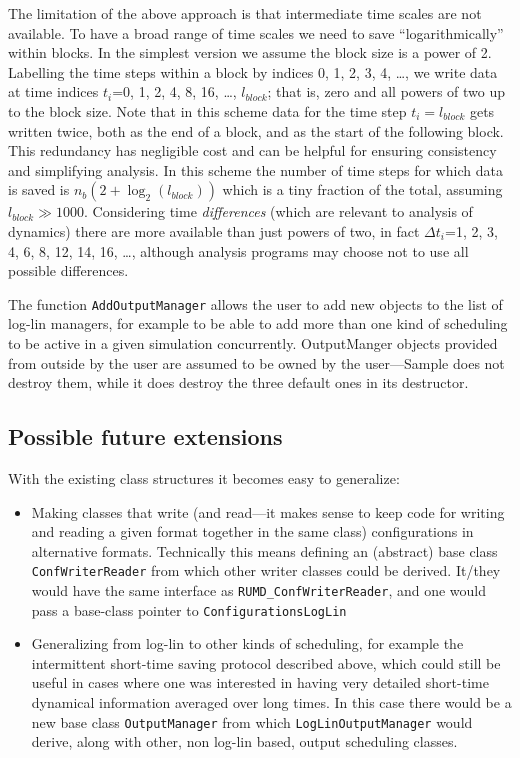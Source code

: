 \documentclass[a4paper]{article}
\begin{document}
The limitation of the above approach is that intermediate time scales are
not available. To have a broad range of time scales we need to save 
``logarithmically'' within blocks. In the simplest version we assume the block 
size is a power of 2. Labelling the time steps within a block by indices 
0, 1, 2, 3, 4, \ldots,  we write data at time indices $t_i$=0, 1, 2, 4, 8, 16,
\ldots, $l_{block}$; that is, zero and all powers of two up to the block size. 
Note that in this scheme data for the time step $t_i=l_{block}$ gets written
twice, both as the end of a block, and as the start of the following block.
This redundancy has negligible cost and can be helpful for ensuring consistency
and simplifying analysis. In this scheme the number of time steps for which 
data is saved is $n_b (2+\log_2(l_{block}))$ which is a tiny fraction of the 
total, assuming $l_{block} \gg 1000$.
Considering time {\em differences} (which are relevant to analysis of dynamics)
there are more available than just powers of two,  in fact 
$\Delta t_i$=1, 2, 3, 4, 6, 8, 12, 14, 16, \ldots, although analysis programs
may choose not to use all possible differences. 


The function \verb|AddOutputManager| allows the user to add new objects
to the list of log-lin managers, for example to be able to add more than one 
kind of scheduling to
be active in a given simulation concurrently. OutputManger objects provided
from outside by the user are assumed to be owned by the user---Sample does not
destroy them, while it does destroy the three default ones in its destructor.


\subsection{Possible future extensions}

With the existing class structures it becomes easy to generalize:

\begin{itemize} 
\item Making classes that write (and read---it makes sense to keep code for
writing and reading a given format together in the same class) configurations 
in alternative formats. Technically this means defining an (abstract) base class
\verb|ConfWriterReader| from which other writer classes could be derived. 
It/they would have the same interface as \verb|RUMD_ConfWriterReader|, and
one would pass a base-class pointer to \verb|ConfigurationsLogLin|
\item Generalizing from
log-lin to other kinds of scheduling, for example
the intermittent short-time saving protocol described above, 
which could still be useful in cases where one was interested in 
having very detailed short-time dynamical information averaged over long
times. In this case there would be a new base class \verb|OutputManager|
from which \verb|LogLinOutputManager| would derive, along with other, non
log-lin based, output scheduling classes.
\end{itemize}
\end{document}
